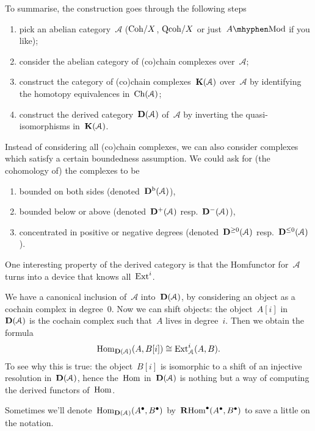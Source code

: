 \documentclass[10pt,a4paper]{article}
\begin{document}
To summarise, the construction goes through the following steps
\begin{enumerate}
  \item pick an abelian category~$\mathcal{A}$ ($\mathrm{Coh}/X$, $\mathrm{Qcoh}/X$ or just~$A\mhyphen\mathrm{Mod}$ if you like);
  \item consider the abelian category of (co)chain complexes over~$\mathcal{A}$;
  \item construct the category of (co)chain complexes~$\mathbf{K}(\mathcal{A})$ over~$\mathcal{A}$ by identifying the homotopy equivalences in~$\operatorname{Ch}(\mathcal{A})$;
  \item construct the derived category~$\mathbf{D}(\mathcal{A})$ of~$\mathcal{A}$ by inverting the quasi-isomorphisms in~$\mathbf{K}(\mathcal{A})$.
\end{enumerate}
Instead of considering all (co)chain complexes, we can also consider complexes which satisfy a certain boundedness assumption. We could ask for (the cohomology of) the complexes to be
\begin{enumerate}
  \item bounded on both sides (denoted~$\mathbf{D}^{\mathrm{b}}(\mathcal{A})$),
  \item bounded below or above (denoted~$\mathbf{D}^+(\mathcal{A})$ resp.\ $\mathbf{D}^-(\mathcal{A})$),
  \item concentrated in positive or negative degrees (denoted~$\mathbf{D}^{\geq 0}(\mathcal{A})$ resp.\ $\mathbf{D}^{\leq 0}(\mathcal{A})$).
\end{enumerate}

One interesting property of the derived category is that the Hom\dash functor for~$\mathcal{A}$ turns into a device that knows all~$\operatorname{Ext}^i$.
\begin{example}
  We have a canonical inclusion of~$\mathcal{A}$ into~$\mathbf{D}(\mathcal{A})$, by considering an object as a cochain complex in degree~$0$. Now we can shift objects: the object~$A[i]$ in~$\mathbf{D}(\mathcal{A})$ is the cochain complex such that~$A$ lives in degree~$i$. Then we obtain the formula
  \begin{equation}
    \label{equation:Hom-Ext}
    \operatorname{Hom}_{\mathbf{D}(\mathcal{A})}(A,B[i])\cong\operatorname{Ext}_{\mathcal{A}}^i(A,B).
  \end{equation}
  To see why this is true: the object~$B[i]$ is isomorphic to a shift of an injective resolution in~$\mathbf{D}(\mathcal{A})$, hence the~$\operatorname{Hom}$ in~$\mathbf{D}(\mathcal{A})$ is nothing but a way of computing the derived functors of~$\operatorname{Hom}$.

  Sometimes we'll denote~$\operatorname{Hom}_{\mathbf{D}(\mathcal{A})}(A^\bullet,B^\bullet)$ by~$\operatorname{\mathbf{R}Hom}^\bullet(A^\bullet,B^\bullet)$ to save a little on the notation.
\end{example}
\end{document}
